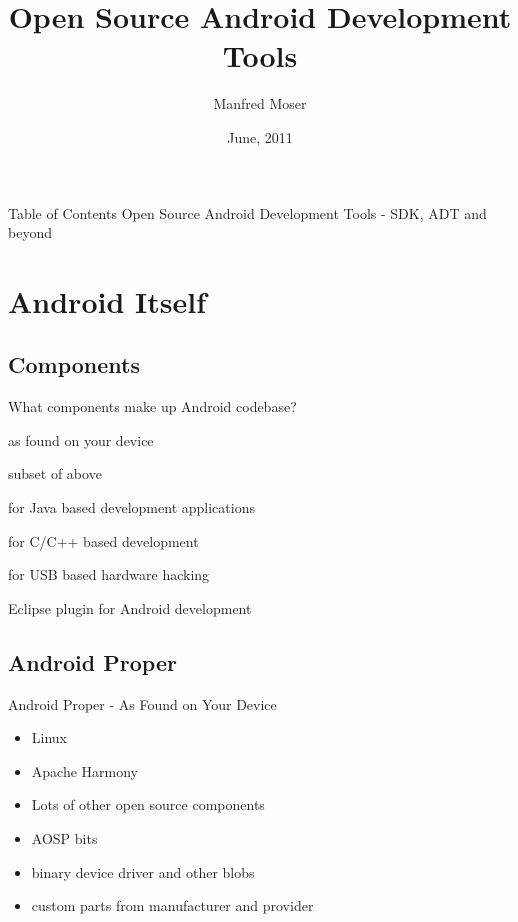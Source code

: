 \documentclass[aspectratio=169]{beamer}
\title{Open Source Android Development Tools}
\author{Manfred Moser}
\date{June, 2011}
\institute{simpligility technologies inc.}
\begin{document}
\begin{frame}
  \titlepage
\end{frame}

\begin{frame}{Table of Contents}
  Open Source Android Development Tools - SDK, ADT and beyond
  \setcounter{tocdepth}{1}
  \tableofcontents
\end{frame}




\section{Android Itself}

  \subsection{Components}
    \begin{frame}{What components make up Android codebase?}
      \begin{description}
        \item<1->[Android Proper] as found on your device
        \item<2->[Android Open Source Project AOSP] subset of above 
        \item<3->[Android Software Development Kit SDK] for Java based development applications
        \item<4->[Android Native Development Kit NDK] for C/C++ based development
        \item<5->[Android Open Accessory Development Kit ADK] for USB based hardware hacking
        \item<6->[Android Development Toolkit ADT] Eclipse plugin for Android development  
      \end{description}
    \end{frame}

  \subsection{Android Proper}
    \begin{frame}{Android Proper - As Found on Your Device}
      \begin{itemize}
        \item<1->Linux
        \item<2->Apache Harmony 
        \item<3->Lots of other open source components
        \item<4->AOSP bits
        \item<5->binary device driver and other blobs 
        \item<6->custom parts from manufacturer and provider
      \end{itemize}
    \end{frame}
  
\end{document}

